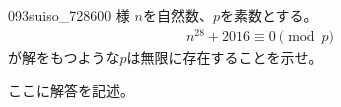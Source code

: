 \begin{thm}{093}{}{suiso\_728600 様}
 $n$を自然数、$p$を素数とする。
 \begin{align*}
  n^{28}+2016 \equiv 0 \pmod p
 \end{align*}
 が解をもつような$p$は無限に存在することを示せ。
\end{thm}

ここに解答を記述。